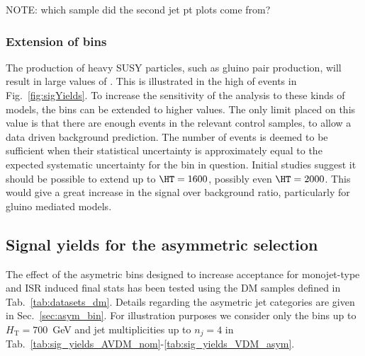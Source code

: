 NOTE: which sample did the second jet pt plots come from?

\subsubsection{Extension of \HT bins}

The production of heavy SUSY particles, such as gluino pair
production, will result in large values of \HT . This is illustrated in the high 
\HT of events in Fig.~\ref{fig:sigYields}. To increase the sensitivity
of the analysis to these kinds of models, the \HT bins can be extended to higher
values. The only limit placed on this value is that there are enough events in the
relevant control samples, to allow a data driven background prediction. The
number of events is deemed to be sufficient when their statistical uncertainty is
approximately equal to the expected systematic uncertainty for the bin in
question. Initial studies suggest it should be possible to extend up to
$\HT=1600$, possibly even $\HT=2000$. This would give a great increase in the
signal over background ratio, particularly for gluino mediated models.

\clearpage
\subsection{Signal yields for the asymmetric selection}
The effect of the asymetric bins designed to increase acceptance for monojet-type and ISR induced final stats has been tested using the DM samples defined in Tab.~\ref{tab:datasets_dm}. Details regarding the asymetric jet categories are given in Sec.~\ref{sec:asym_bin}.
For illustration purposes we consider only the bins up to $H_\textrm{T}=700$~GeV and jet multiplicities up to $n_j=4$ in Tab.~\ref{tab:sig_yields_AVDM_nom}-\ref{tab:sig_yields_VDM_asym}.

